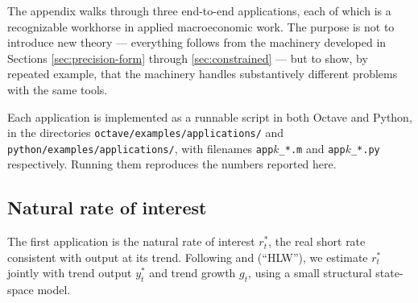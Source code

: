 \documentclass[11pt]{article}
\begin{document}
The appendix walks through three end-to-end applications, each of
which is a recognizable workhorse in applied macroeconomic work.  The
purpose is not to introduce new theory --- everything follows from
the machinery developed in Sections \ref{sec:precision-form} through
\ref{sec:constrained} --- but to show, by repeated example, that the
machinery handles substantively different problems with the same tools.

Each application is implemented as a runnable script in both Octave
and Python, in the directories
\texttt{octave/examples/applications/} and
\texttt{python/examples/}\allowbreak\texttt{applications/}, with filenames
\texttt{app$k$\_*.m} and \texttt{app$k$\_*.py} respectively.  Running
them reproduces the numbers reported here.

\subsection{Natural rate of interest}
\label{sec:apps-rstar}

The first application is the natural rate of interest $r^*_t$, the
real short rate consistent with output at its trend.  Following
\citet{LaubachWilliams2003} and \citet{HolstonLaubachWilliams2017}
(``HLW''), we estimate $r^*_t$ jointly with trend output $y^*_t$
and trend growth $g_t$, using a small structural state-space model.
\end{document}
